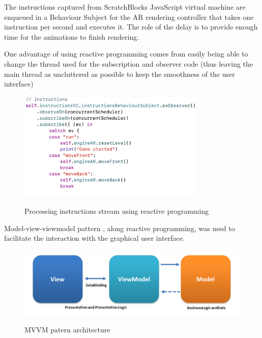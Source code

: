 \documentclass[12 pct]{report}
\begin{document}
The instructions captured from ScratchBlocks JavaScript virtual machine are enqueued in a Behaviour Subject for the AR rendering controller that takes one instruction per second and executes it. The role of the delay is to provide enough time for the animations to finish rendering. 

One advantage of using reactive programming comes from easily being able to change the thread used for the subscription and observer code (thus leaving the main thread as uncluttered as possible to keep the smoothness of the user interface)
\begin{figure}[H]
\includegraphics[width=0.8\textwidth]{reactive-instructions}
\centering
\label{fig:reactive-repository}
\caption{Processing instructions stream using reactive programming}
\end{figure}

Model-view-viewmodel pattern \cite{anderson2012model}, along reactive programming, was used to facilitate the interaction with the graphical user interface.

\begin{figure}[H]
\includegraphics[width=1.0\textwidth]{mvvm}
\centering
\label{fig:reactive-repository}
\caption{MVVM patern architecture }
\end{figure}
\end{document}
